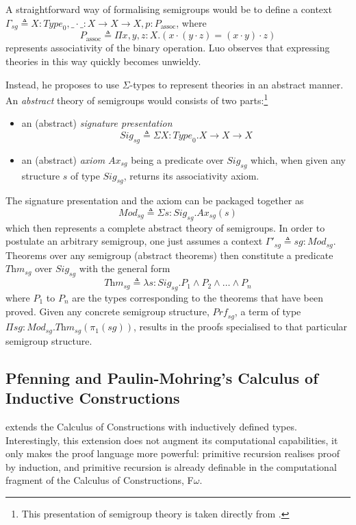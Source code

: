 \documentclass[12pt,toc=bibliography,numbers=noendperiod,
               footnotes=multiple,twoside]{scrartcl}
\begin{document}
A straightforward way of formalising semigroups would be to define a context \(\Gamma_{sg} \triangleq X : \textit{Type}_0, \_\cdot\_ : X \rightarrow X \rightarrow X, p : P_\textrm{assoc}\), where \[P_\textrm{assoc} \triangleq \Pi x,y,z:X.(x \cdot (y \cdot z) = (x \cdot y) \cdot z)\] represents associativity of the binary operation. Luo observes that expressing theories in this way quickly becomes unwieldy.

Instead, he proposes to use \(\Sigma\)-types to represent theories in an abstract manner. An \emph{abstract} theory of semigroups would consists of two parts:\footnote{This presentation of semigroup theory is taken directly from \textcite[100]{luo_extended_1990}.}

\begin{itemize}
\item an (abstract) \emph{signature presentation} \[\textit{Sig}_{sg} \triangleq \Sigma X : \textit{Type}_0. X \rightarrow X \rightarrow X\]
\item an (abstract) \emph{axiom} \(\textit{Ax}_{sg}\) being a predicate over \(\textit{Sig}_{sg}\) which, when given any structure \(s\) of type \(\textit{Sig}_{sg}\), returns its associativity axiom.
\end{itemize}

The signature presentation and the axiom can be packaged together as \[\textit{Mod}_{sg} \triangleq \Sigma s : \textit{Sig}_{sg}. \textit{Ax}_{sg}(s)\] which then represents a complete abstract theory of semigroups. In order to postulate an arbitrary semigroup, one just assumes a context \(\Gamma'_{sg} \triangleq sg : \textit{Mod}_{sg}\). Theorems over any semigroup (abstract theorems) then constitute a predicate \(\textit{Thm}_{sg}\) over \(\textit{Sig}_{sg}\) with the general form \[\textit{Thm}_{sg} \triangleq \lambda s : \textit{Sig}_{sg}. P_1 \wedge P_2 \wedge \dots \wedge P_n\] where \(P_1\) to \(P_n\) are the types corresponding to the theorems that have been proved. Given any concrete semigroup structure, \(\textit{Prf}_{sg}\), a term of type \(\Pi sg : \textit{Mod}_{sg}. \textit{Thm}_{sg}(\pi_1(sg))\), results in the proofs specialised to that particular semigroup structure.

\subsection{Pfenning and Paulin-Mohring's Calculus of Inductive Constructions}

\textcite{pfenning_inductively_1990} extends the Calculus of Constructions with inductively defined types. Interestingly, this extension does not augment its computational capabilities, it only makes the proof language more powerful: primitive recursion realises proof by induction, and primitive recursion is already definable in the computational fragment of the Calculus of Constructions, F\(\omega\).
\end{document}
